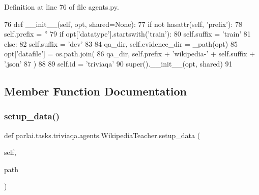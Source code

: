 Definition at line 76 of file agents.\+py.


\begin{DoxyCode}
76     \textcolor{keyword}{def }\_\_init\_\_(self, opt, shared=None):
77         \textcolor{keywordflow}{if} \textcolor{keywordflow}{not} hasattr(self, \textcolor{stringliteral}{'prefix'}):
78             self.prefix = \textcolor{stringliteral}{''}
79             \textcolor{keywordflow}{if} opt[\textcolor{stringliteral}{'datatype'}].startswith(\textcolor{stringliteral}{'train'}):
80                 self.suffix = \textcolor{stringliteral}{'train'}
81             \textcolor{keywordflow}{else}:
82                 self.suffix = \textcolor{stringliteral}{'dev'}
83 
84         qa\_dir, self.evidence\_dir = \_path(opt)
85         opt[\textcolor{stringliteral}{'datafile'}] = os.path.join(
86             qa\_dir, self.prefix + \textcolor{stringliteral}{'wikipedia-'} + self.suffix + \textcolor{stringliteral}{'.json'}
87         )
88 
89         self.id = \textcolor{stringliteral}{'triviaqa'}
90         super().\_\_init\_\_(opt, shared)
91 
\end{DoxyCode}


\subsection{Member Function Documentation}
\mbox{\label{classparlai_1_1tasks_1_1triviaqa_1_1agents_1_1WikipediaTeacher_a649481f4defd773a4e047b2b5b562bf4}} 
\subsubsection{\texorpdfstring{setup\+\_\+data()}{setup\_data()}}
{\footnotesize\ttfamily def parlai.\+tasks.\+triviaqa.\+agents.\+Wikipedia\+Teacher.\+setup\+\_\+data (\begin{DoxyParamCaption}\item[{}]{self,  }\item[{}]{path }\end{DoxyParamCaption})}



